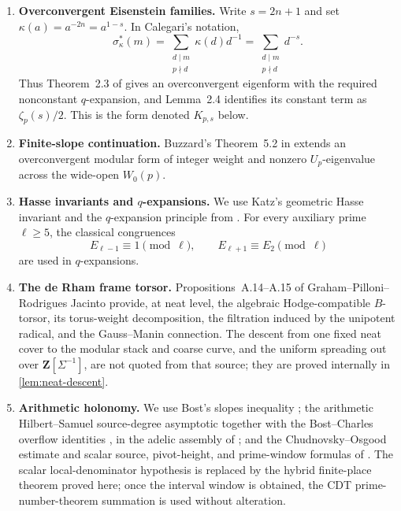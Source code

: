 \documentclass[11pt]{article}
\theoremstyle{definition}
\theoremstyle{remark}
\newcommand{\Z}{\mathbf Z}
\begin{document}
\begin{enumerate}[label=\textup{(E\arabic*)},leftmargin=3em]
\item \textbf{Overconvergent Eisenstein families.}
Write $s=2n+1$ and set $\kappa(a)=a^{-2n}=a^{1-s}$.  In Calegari's notation,
\[
 \sigma_\kappa^*(m)
 =\sum_{\substack{d\mid m\\p\nmid d}}\kappa(d)d^{-1}
 =\sum_{\substack{d\mid m\\p\nmid d}}d^{-s}.
\]
Thus Theorem~2.3 of \cite{Calegari2005} gives an overconvergent eigenform
with the required nonconstant $q$-expansion, and Lemma~2.4 identifies its
constant term as $\zeta_p(s)/2$.  This is the form denoted $K_{p,s}$ below.

\item \textbf{Finite-slope continuation.}
Buzzard's Theorem~5.2 in \cite{Buzzard2003} extends an overconvergent modular
form of integer weight and nonzero $U_p$-eigenvalue across the wide-open
$W_0(p)$.

\item \textbf{Hasse invariants and $q$-expansions.}
We use Katz's geometric Hasse invariant and the $q$-expansion principle from
\cite{Katz1973}.  For every auxiliary prime $\ell\ge5$, the classical
congruences
\[
 E_{\ell-1}\equiv1\pmod\ell,
 \qquad E_{\ell+1}\equiv E_2\pmod\ell
\]
are used in $q$-expansions.

\item \textbf{The de Rham frame torsor.}
Propositions~A.14--A.15 of Graham--Pilloni--Rodrigues Jacinto
\cite{GPRJ2025} provide, at neat level, the algebraic Hodge-compatible
$B$-torsor, its torus-weight decomposition, the filtration induced by the
unipotent radical, and the Gauss--Manin connection.  The descent from one
fixed neat cover to the modular stack and coarse curve, and the uniform
spreading out over \(\Z[\Sigma^{-1}]\), are not quoted from that source; they
are proved internally in \cref{lem:neat-descent}.

\item \textbf{Arithmetic holonomy.}
We use Bost's slopes inequality \cite{Bost2001}; the arithmetic
Hilbert--Samuel source-degree asymptotic together with the Bost--Charles
overflow identities
\cite[Theorem~5.4.1 and Proposition~5.4.2]{BostCharles2022}, in the adelic
assembly of \cite[Theorem~2.6 and Section~2.3]{CDT2025}; and the
Chudnovsky--Osgood estimate and scalar source, pivot-height, and prime-window
formulas of \cite[Theorem~3.2.13 and Section~7.3, especially
(7.3.7) and (7.3.14)--(7.3.16)]{CDT2024}.  The scalar local-denominator
hypothesis is replaced by the hybrid finite-place theorem proved here; once
the interval window is obtained, the CDT prime-number-theorem summation is
used without alteration.
\end{enumerate}
\end{document}
